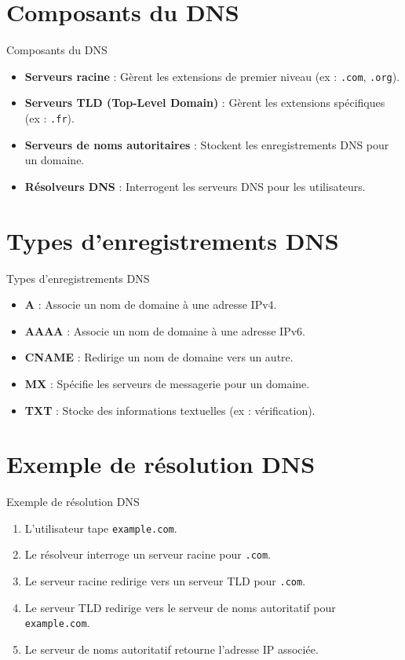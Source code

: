 \documentclass{clbeamer2024}
\begin{document}
	
	\section{Composants du DNS}
	\begin{frame}{Composants du DNS}
		\begin{itemize}
			\item \textbf{Serveurs racine} : Gèrent les extensions de premier niveau (ex : \texttt{.com}, \texttt{.org}).
			\item \textbf{Serveurs TLD (Top-Level Domain)} : Gèrent les extensions spécifiques (ex : \texttt{.fr}).
			\item \textbf{Serveurs de noms autoritaires} : Stockent les enregistrements DNS pour un domaine.
			\item \textbf{Résolveurs DNS} : Interrogent les serveurs DNS pour les utilisateurs.
		\end{itemize}
	\end{frame}
	
	\section{Types d'enregistrements DNS}
	\begin{frame}{Types d'enregistrements DNS}
		\begin{itemize}
			\item \textbf{A} : Associe un nom de domaine à une adresse IPv4.
			\item \textbf{AAAA} : Associe un nom de domaine à une adresse IPv6.
			\item \textbf{CNAME} : Redirige un nom de domaine vers un autre.
			\item \textbf{MX} : Spécifie les serveurs de messagerie pour un domaine.
			\item \textbf{TXT} : Stocke des informations textuelles (ex : vérification).
		\end{itemize}
	\end{frame}
	
	\section{Exemple de résolution DNS}
	\begin{frame}{Exemple de résolution DNS}
		\begin{enumerate}
			\item L'utilisateur tape \texttt{example.com}.
			\item Le résolveur interroge un serveur racine pour \texttt{.com}.
			\item Le serveur racine redirige vers un serveur TLD pour \texttt{.com}.
			\item Le serveur TLD redirige vers le serveur de noms autoritatif pour \texttt{example.com}.
			\item Le serveur de noms autoritatif retourne l'adresse IP associée.
		\end{enumerate}
	\end{frame}
	
\end{document}
